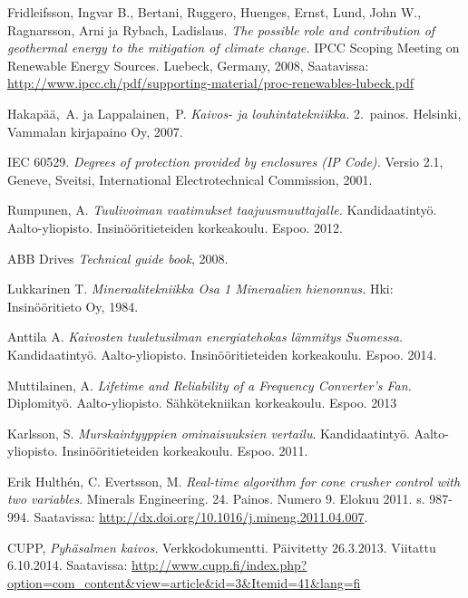 \documentclass[finnish,12pt,a4paper,pdftex,elec,utf8]{aaltothesis}
\begin{document}
\thesisbibliography
\begin{thebibliography}{99}
	
Fridleifsson, Ingvar B., Bertani, Ruggero, Huenges, Ernst, Lund, John W., Ragnarsson, Arni ja Rybach, Ladislaus. \textit{The possible role and contribution of geothermal energy to the mitigation of climate change.} IPCC Scoping Meeting on Renewable Energy Sources. Luebeck, Germany, 2008, Saatavissa: \url{http://www.ipcc.ch/pdf/supporting-material/proc-renewables-lubeck.pdf}

Hakapää,\ A. ja Lappalainen,\ P. \textit{Kaivos- ja louhintatekniikka.} 2.\ painos. Helsinki, Vammalan kirjapaino Oy, 2007.

IEC 60529. \textit{Degrees of protection provided by enclosures (IP Code).} Versio 2.1, Geneve, Sveitsi, International Electrotechnical Commission, 2001.

Rumpunen, A. \textit{Tuulivoiman vaatimukset taajuusmuuttajalle.} Kandidaatintyö. Aalto-yliopisto. 
Insinööritieteiden korkeakoulu. Espoo. 2012.

ABB Drives \textit{Technical guide book}, 2008.

Lukkarinen T. \textit{Mineraalitekniikka Osa 1 Mineraalien hienonnus.} Hki: Insinööritieto Oy, 1984.

Anttila A. \textit{Kaivosten tuuletusilman energiatehokas lämmitys Suomessa.} Kandidaatintyö. Aalto-yliopisto. Insinööritieteiden korkeakoulu. Espoo. 2014.

Muttilainen, A. \textit{Lifetime and Reliability of a Frequency Converter’s Fan.} Diplomityö. Aalto-yliopisto. Sähkötekniikan korkeakoulu. Espoo. 2013

Karlsson, S. \textit{Murskaintyyppien ominaisuuksien vertailu}. Kandidaatintyö. Aalto-yliopisto. Insinööritieteiden korkeakoulu. Espoo. 2011.

Erik Hulthén, C. Evertsson, M. \textit{Real-time algorithm for cone crusher control with two variables}. Minerals Engineering.  24. Painos. Numero 9. Elokuu 2011. s. 987-994. Saatavissa: \url{http://dx.doi.org/10.1016/j.mineng.2011.04.007}.

CUPP, \textit{Pyhäsalmen kaivos.} Verkkodokumentti. Päivitetty 26.3.2013. Viitattu 6.10.2014. Saatavissa: \url{http://www.cupp.fi/index.php?option=com_content&view=article&id=3&Itemid=41&lang=fi	}


\end{thebibliography}
\end{document}
